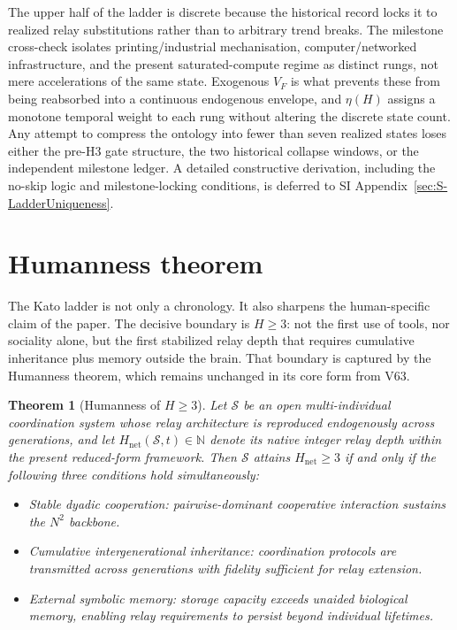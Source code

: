 \documentclass[11pt]{article}
\newtheorem{theorem}{Theorem}[section]
\begin{document}
The upper half of the ladder is discrete because the historical record locks it to realized relay substitutions rather than to arbitrary trend breaks.
The milestone cross-check isolates printing/industrial mechanisation,
computer/networked infrastructure,
and the present saturated-compute regime as distinct rungs,
not mere accelerations of the same state.
Exogenous \(V_F\) is what prevents these from being reabsorbed into a continuous endogenous envelope,
and \(\eta(H)\) assigns a monotone temporal weight to each rung without altering the discrete state count.
Any attempt to compress the ontology into fewer than seven realized states loses either the pre-H3 gate structure,
the two historical collapse windows,
or the independent milestone ledger.
A detailed constructive derivation,
including the no-skip logic and milestone-locking conditions,
is deferred to SI Appendix~\ref{sec:S-LadderUniqueness}.

\section{Humanness theorem}\label{sec:humanness}

The Kato ladder is not only a chronology.
It also sharpens the human-specific claim of the paper.
The decisive boundary is \(H\ge 3\):
not the first use of tools,
nor sociality alone,
but the first stabilized relay depth that requires cumulative inheritance plus memory outside the brain.
That boundary is captured by the Humanness theorem,
which remains unchanged in its core form from V63.

\begin{theorem}[Humanness of \(H\ge 3\)]
\label{thm:humanness}
Let \(\mathcal{S}\) be an open multi-individual coordination system whose relay architecture is reproduced endogenously across generations,
and let \(H_{\mathrm{net}}(\mathcal{S},t)\in\mathbb{N}\) denote its native integer relay depth within the present reduced-form framework.
Then \(\mathcal{S}\) attains \(H_{\mathrm{net}}\ge 3\) if and only if the following three conditions hold simultaneously:
\begin{itemize}
\item[\textbf{C1.}] Stable dyadic cooperation:
pairwise-dominant cooperative interaction sustains the \(N^2\) backbone.
\item[\textbf{C2.}] Cumulative intergenerational inheritance:
coordination protocols are transmitted across generations with fidelity sufficient for relay extension.
\item[\textbf{C3.}] External symbolic memory:
storage capacity exceeds unaided biological memory,
enabling relay requirements to persist beyond individual lifetimes.
\end{itemize}
\end{theorem}
\end{document}
